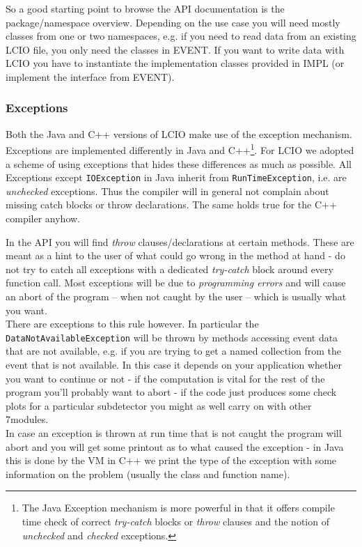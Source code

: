 \documentclass[twoside]{article}
\begin{document}
So a good starting point to browse the API documentation is the package/namespace overview.
Depending on the use case you will need mostly classes from one or two namespaces, e.g. if you need 
to read data from an existing LCIO file, you only need the classes in EVENT.
If you want to write data with LCIO you have to instantiate the implementation classes provided in 
IMPL (or implement the interface from EVENT).



\subsubsection{Exceptions} \label{exceptions}
Both the Java and C++ versions of LCIO make use of the exception mechanism. Exceptions are 
implemented differently in Java and C++\footnote{The Java Exception mechanism is more powerful 
in that it offers compile time check of correct {\em try-catch} blocks or {\em throw} clauses 
and the notion of {\em unchecked} and {\em checked} exceptions.}. 
For LCIO we adopted a scheme of using exceptions that 
hides these differences as much as possible. All Exceptions except \verb$IOException$ in Java inherit 
from \verb$RunTimeException$, i.e. are {\em unchecked} exceptions. Thus the compiler will in general 
not complain about missing catch blocks or throw declarations. The same holds true for the C++ compiler 
anyhow.

In the API you will find {\em throw} clauses/declarations at certain methods. These are meant as a hint
to the user of what could go wrong in the method at hand - do not try to catch all exceptions with a 
dedicated {\em try-catch} block around every function call. Most exceptions will be due to 
{\em programming errors} and will cause an abort of the program -- when not caught by the user -- 
which is usually what you want.\\
There are exceptions to this rule however. In particular the \verb$DataNotAvailableException$ will be
thrown by methods accessing event data that are not available, e.g. if you are trying to get a named 
collection from the event that is not available. 
In this case it depends on your application whether you want to continue or not - if the 
computation is vital for the rest of the program you'll probably want to abort - if the code just
produces some check plots for a particular subdetector you might as well carry on with other 
7modules.\\
In case an exception is thrown at run time that is not caught the program will abort and you will get 
some printout as to what caused the exception - 
in Java this is done by the VM in C++ we print the type of the exception with some information on the 
problem (usually the class and function name).
\end{document}
